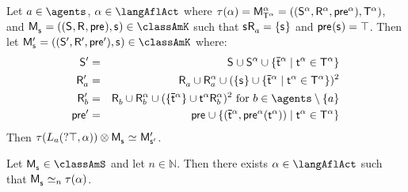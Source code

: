 \begin{lemma}\label{afl-s-construction-learning}
Let $\agentA \in \agents$, $\alpha \in \langAflAct$ where $\tau(\alpha) = \aPModel[\alpha]{\aStatesT[\alpha]} = \aPModelTuple[\alpha]{\aStatesT[\alpha]}$, and $\aPModel{\aStateS} = \aPModelTuple{\aStateS} \in \classAmK$ such that $\aStateS \aAccessibility{\agentA} = \{\aStateS\}$ and $\aPrecondition(\aStateS) = \top$.
Then let $\aPModelP{\aStateS} = \aPModelTupleP{\aStateS} \in \classAmK$ where:
\begin{eqnarray*}
    \aStatesP &=& \aStates \cup \aStates[\alpha] \cup \{\aPStateT[\alpha] \mid \aStateT[\alpha] \in \aStatesT[\alpha]\}\\
    \aAccessibilityP{\agentA} &=& \aAccessibility{\agentA} \cup \aAccessibility[\alpha]{\agentA} \cup (\{\aStateS\} \cup \{\aPStateT[\alpha] \mid \aStateT[\alpha] \in \aStatesT[\alpha]\})^2\\
    \aAccessibilityP{\agentB} &=& \aAccessibility{\agentB} \cup \aAccessibility[\alpha]{\agentB} \cup (\{\aPStateT[\alpha]\} \cup \aStateT[\alpha] \aAccessibility[\alpha]{\agentB})^2 \text{ for } \agentB \in \agents \setminus \{\agentA\}\\
    \aPreconditionP &=& \aPrecondition \cup \{(\aPStateT[\alpha], \aPrecondition[\alpha](\aStateT[\alpha])) \mid \aStateT[\alpha] \in \aStatesT[\alpha]\}
\end{eqnarray*}
Then $\tau(\learnsA (\test{\top}, \alpha)) \exec \aPModel{\aStateS} \bisimilar \aPModelP{\aStateSP}$.
\end{lemma}

\begin{proposition}\label{afl-s-correspondence}
Let $\aPModel{\aStateS} \in \classAmS$ and let $n \in \mathbb{N}$. 
Then there exists $\alpha \in \langAflAct$ such that $\aPModel{\aStateS} \bisimilar[n] \tau(\alpha)$.
\end{proposition}

